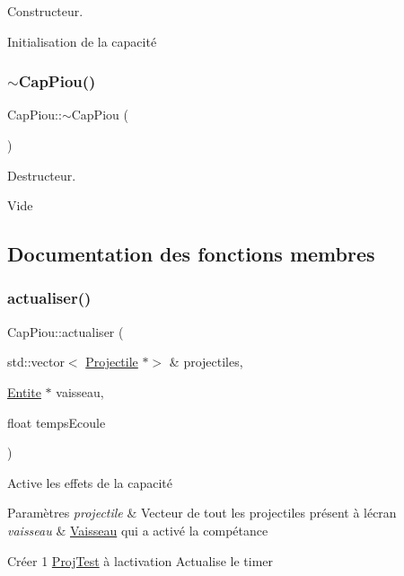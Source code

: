 Constructeur. 

Initialisation de la capacité \mbox{\label{class_cap_piou_a35d7e0b0c14d6a6e01ba0a053a8a60bd}} 
\subsubsection{\texorpdfstring{$\sim$\+Cap\+Piou()}{~CapPiou()}}
{\footnotesize\ttfamily Cap\+Piou\+::$\sim$\+Cap\+Piou (\begin{DoxyParamCaption}{ }\end{DoxyParamCaption})}



Destructeur. 

Vide 

\subsection{Documentation des fonctions membres}
\mbox{\label{class_cap_piou_ae15af0a5a261349ae8462f00b6cb0d5d}} 
\subsubsection{\texorpdfstring{actualiser()}{actualiser()}}
{\footnotesize\ttfamily Cap\+Piou\+::actualiser (\begin{DoxyParamCaption}\item[{std\+::vector$<$ \hyperlink{class_projectile}{Projectile} $\ast$$>$ \&}]{projectiles,  }\item[{\hyperlink{class_entite}{Entite} $\ast$}]{vaisseau,  }\item[{float}]{temps\+Ecoule }\end{DoxyParamCaption})\hspace{0.3cm}{\ttfamily [virtual]}}



Active les effets de la capacité 


\begin{DoxyParams}{Paramètres}
{\em projectile} & Vecteur de tout les projectiles présent à l\textquotesingle{}écran \\
\hline
{\em vaisseau} & \hyperlink{class_vaisseau}{Vaisseau} qui a activé la compétance\\
\hline
\end{DoxyParams}
Créer 1 \hyperlink{class_proj_test}{Proj\+Test} à l\textquotesingle{}activation Actualise le timer 

